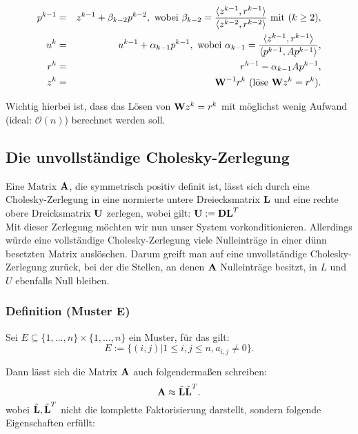 \begin{eqnarray}
p^{k-1} &=& z^{k-1} + \beta_{k-2}p^{k-2}, \textnormal{ wobei } \beta_{k-2} = \frac {\langle z^{k-1}, r^{k-1} \rangle} {\langle z^{k-2}, r^{k-2} \rangle} \textnormal{ mit } (k \ge 2), \notag \\
u^{k} &=& u^{k-1} + \alpha_{k-1}p^{k-1}, \textnormal{ wobei } \alpha_{k-1} = \frac {\langle z^{k-1}, r^{k-1} \rangle} {\langle p^{k-1}, Ap^{k-1} \rangle}, \notag \\
r^{k} &=& r^{k-1} - \alpha_{k-1}Ap^{k-1}, \notag \\
z^{k} &=& {\textbf{W}}^{-1}r^{k} \textnormal{ (löse } {\textbf{W}}z^{k} = r^{k}). \notag
\end{eqnarray}

Wichtig hierbei ist, dass das Lösen von ${\textbf{W}}z^{k} = r^{k}$ mit möglichst wenig Aufwand (ideal: $\mathcal{O}(n)$) berechnet werden soll.

\subsection{Die unvollständige Cholesky-Zerlegung}\label{ss.ICCG}

Eine Matrix ${\textbf{A}}$, die symmetrisch positiv definit ist, lässt sich durch eine Cholesky-Zerlegung in eine normierte untere Dreiecksmatrix ${\textbf{L}}$ und eine rechte obere Dreicksmatrix ${\textbf{U}}$ zerlegen, wobei gilt: ${\textbf{U}} := {\textbf{D}}{\textbf{L}}^{T}$ \\
Mit dieser Zerlegung möchten wir nun unser System vorkonditionieren. Allerdings würde eine vollständige Cholesky-Zerlegung viele Nulleinträge in einer dünn besetzten Matrix auslöschen. Darum greift man auf eine unvollständige Cholesky-Zerlegung zurück, bei der die Stellen, an denen ${\textbf{A}}$ Nulleinträge besitzt, in $L$ und $U$ ebenfalls Null bleiben.

\subsubsection{Definition (Muster E)}\label{sss.Muster E}

Sei $E \subseteq \{1,...,n\} \times \{1,...,n\}$ ein Muster, für das gilt:
\begin{equation}
E := \{(i,j) | 1 \le i,j \le n, a_{i,j} \ne 0 \}.
\end{equation}

Dann lässt sich die Matrix ${\textbf{A}}$ auch folgendermaßen schreiben:
\begin{equation}
{\textbf{A}} \approx \tilde{{\textbf{L}}} \tilde{{\textbf{L}}}^{T}.
\end{equation}
wobei $\tilde{{\textbf{L}}}, \tilde{{\textbf{L}}}^{T}$ nicht die komplette Faktorisierung darstellt, sondern folgende Eigenschaften erfüllt:

